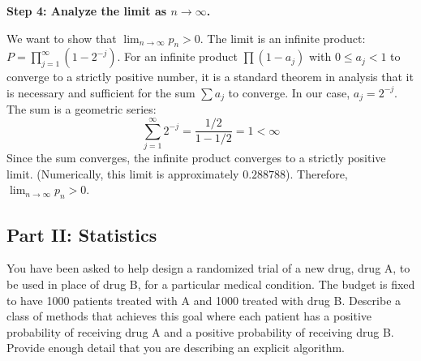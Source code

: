 \begin{solution}
\textbf{Step 4: Analyze the limit as $n \to \infty$.}

We want to show that $\lim_{n \to \infty} p_n > 0$.
The limit is an infinite product: $P = \prod_{j=1}^\infty (1 - 2^{-j})$.
For an infinite product $\prod (1 - a_j)$ with $0 \leq a_j < 1$ to converge to a strictly positive number, it is a standard theorem in analysis that it is necessary and sufficient for the sum $\sum a_j$ to converge.
In our case, $a_j = 2^{-j}$. The sum is a geometric series:
\[ \sum_{j=1}^\infty 2^{-j} = \frac{1/2}{1 - 1/2} = 1 < \infty \]
Since the sum converges, the infinite product converges to a strictly positive limit.
(Numerically, this limit is approximately $0.288788$).
Therefore, $\lim_{n \to \infty} p_n > 0$.
\end{solution}

\subsection{Part II: Statistics}

\begin{exercise}\label{probability:2023:5}
You have been asked to help design a randomized trial of a new drug, drug A, to be used in place of drug B, for a particular medical condition. The budget is fixed to have 1000 patients treated with A and 1000 treated with drug B. Describe a class of methods that achieves this goal where each patient has a positive probability of receiving drug A and a positive probability of receiving drug B. Provide enough detail that you are describing an explicit algorithm.
\end{exercise}

